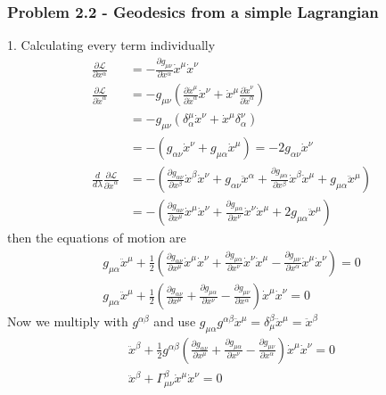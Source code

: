 \documentclass[10pt,a4paper]{article}
\theoremstyle{definition}
\begin{document}
\subsubsection{Problem 2.2 - Geodesics from a simple Lagrangian}
1. Calculating every term individually
\begin{align}
\frac{\partial\mathcal{L}}{\partial x^\alpha}
&=-\frac{\partial g_{\mu\nu}}{\partial x^\alpha}\dot{x}^\mu\dot{x}^\nu\\
\frac{\partial\mathcal{L}}{\partial \dot{x}^\alpha}
&=-g_{\mu\nu}\left(\frac{\partial\dot{x}^\mu}{\partial\dot{x}^\alpha}\dot{x}^\nu+\dot{x}^\mu\frac{\partial\dot{x}^\nu}{\partial\dot{x}^\alpha}\right)\\
&=-g_{\mu\nu}\left(\delta^\mu_\alpha\dot{x}^\nu+\dot{x}^\mu\delta^\nu_\alpha\right)\\
&=-(g_{\alpha\nu}\dot{x}^\nu+g_{\mu\alpha}\dot{x}^\mu)=-2g_{\alpha\nu}\dot{x}^\nu\\
\frac{d}{d\lambda}\frac{\partial\mathcal{L}}{\partial \dot{x}^\alpha}
&=-\left(\frac{\partial g_{\alpha\nu}}{\partial x^\beta}\dot{x}^\beta\dot{x}^\nu+g_{\alpha\nu}\ddot{x}^\alpha+\frac{\partial g_{\mu\alpha}}{\partial x^\beta}\dot{x}^\beta\dot{x}^\mu+g_{\mu\alpha}\ddot{x}^\mu\right)\\
&=-\left(\frac{\partial g_{\alpha\nu}}{\partial x^\mu}\dot{x}^\mu\dot{x}^\nu
+\frac{\partial g_{\mu\alpha}}{\partial x^\nu}\dot{x}^\nu\dot{x}^\mu
+2g_{\mu\alpha}\ddot{x}^\mu\right)
\end{align}
then the equations of motion are
\begin{align}
g_{\mu\alpha}\ddot{x}^\mu+\frac{1}{2}\left(\frac{\partial g_{\alpha\nu}}{\partial x^\mu}\dot{x}^\mu\dot{x}^\nu
+\frac{\partial g_{\mu\alpha}}{\partial x^\nu}\dot{x}^\nu\dot{x}^\mu-\frac{\partial g_{\mu\nu}}{\partial x^\alpha}\dot{x}^\mu\dot{x}^\nu\right)=0\\
g_{\mu\alpha}\ddot{x}^\mu+\frac{1}{2}\left(\frac{\partial g_{\alpha\nu}}{\partial x^\mu}
+\frac{\partial g_{\mu\alpha}}{\partial x^\nu}-\frac{\partial g_{\mu\nu}}{\partial x^\alpha}\right)\dot{x}^\mu\dot{x}^\nu=0
\end{align}
Now we multiply with $g^{\alpha\beta}$ and use $g_{\mu\alpha}g^{\alpha\beta}\ddot{x}^\mu=\delta^\beta_\mu\ddot{x}^\mu=\ddot{x}^\beta$
\begin{align}
\ddot{x}^\beta+\frac{1}{2}g^{\alpha\beta}\left(\frac{\partial g_{\alpha\nu}}{\partial x^\mu}
+\frac{\partial g_{\mu\alpha}}{\partial x^\nu}-\frac{\partial g_{\mu\nu}}{\partial x^\alpha}\right)\dot{x}^\mu\dot{x}^\nu=0\\
\ddot{x}^\beta+\Gamma^\beta_{\mu\nu}\dot{x}^\mu\dot{x}^\nu=0
\end{align}
\end{document}
